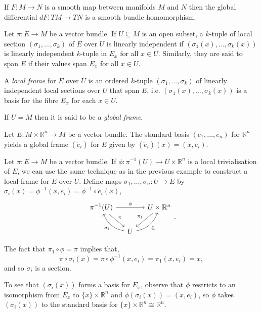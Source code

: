 \documentclass[12pt,a4paper]{article}
\begin{document}
\begin{example}
If $F:M\to N$ is a smooth map between manifolds $M$ and $N$ then the global differential $dF:TM\to TN$ is a smooth bundle homomorphism.
\end{example}

Let $\pi:E\to M$ be a vector bundle. If $U\subseteq M$ is an open subset, a $k$-tuple of local section $(\sigma_1,\ldots,\sigma_k)$ of $E$ over $U$ is linearly independent if $(\sigma_1(x),\ldots,\sigma_k(x))$ is linearly independent $k$-tuple in $E_x$ for all $x\in U$. Similarly, they are said to span $E$ if their values span $E_x$ for all $x\in U$.

\begin{definition}
A \textit{local frame} for $E$ over $U$ is an ordered $k$-tuple $(\sigma_1,\ldots,\sigma_k)$ of linearly independent local sections over $U$ that span $E$, i.e. $(\sigma_1(x),\ldots,\sigma_k(x))$ is a basis for the fibre $E_x$ for each $x\in U$.

If $U=M$ then it is said to be a \textit{global frame}.
\end{definition}
\begin{example}
Let $E:M\times\mathbb{R}^n\to M$ be a vector bundle. The standard basis $(e_1,\ldots,e_n)$ for $\mathbb{R}^n$ yields a global frame $(\tilde{e}_i)$ for $E$ given by $(\tilde{e}_i)(x)=(x,e_i)$.
\end{example}
\begin{example}
Let $\pi:E\to M$ be a vector bundle. If $\phi:\pi^{-1}(U)\to U\times \mathbb{R}^n$ is a local trivialisation of $E$, we can use the same technique as in the previous example to construct a local frame for $E$ over $U$. Define maps $\sigma_1,\ldots,\sigma_n: U\to E$ by $\sigma_i(x)=\phi^{-1}(x,e_i)=\phi^{-1}\circ\tilde{e}_i(x)$,
\[
\begin{tikzcd}[column sep=small]
\pi^{-1}(U) \arrow{dr}{\pi} \arrow{rr}{\phi} && U\times\mathbb{R}^n \arrow{dl}[swap]{\pi_1}\\
&U \arrow[ul, bend left, "\sigma_i"] \arrow[ur, bend right,swap,"\tilde{e}_i"]
\end{tikzcd}.
\]

The fact that $\pi_1\circ\phi=\pi$ implies that,
\[
\pi\circ\sigma_i(x)=\pi\circ\phi^{-1}(x,e_i)=\pi_1(x,e_i)=x,
\]
and so $\sigma_i$ is a section.

To see that $(\sigma_i(x))$ forms a basis for $E_x$, observe that $\phi$ restricts to an isomorphism from $E_x$ to $\{x\}\times\mathbb{R}^n$ and $\phi(\sigma_i(x))=(x,e_i)$, so $\phi$ takes $(\sigma_i(x))$ to the standard basis for $\{x\}\times\mathbb{R}^n\cong\mathbb{R}^n$.
\end{example}
\end{document}
